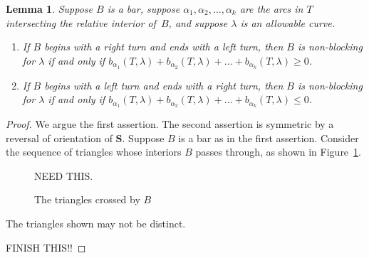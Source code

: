 \documentclass{amsart}
\newtheorem{lemma}[proposition]{Lemma}
\theoremstyle{definition}
\theoremstyle{remark}
\numberwithin{equation}{section}
\newcommand{\0}{{\mathbf{0}}}
\renewcommand{\S}{\mathbf{S}}
\begin{document}
\begin{lemma}\label{bar ineq}
Suppose $B$ is a bar, suppose $\alpha_1, \alpha_2,\ldots,\alpha_k$ are the arcs in $T$ intersecting the relative interior of~$B$, and suppose $\lambda$ is an allowable curve.
\begin{enumerate}[\qquad1.]
\item If $B$ begins with a right turn and ends with a left turn, then $B$ is non-blocking for $\lambda$ if and only if $b_{\alpha_1}(T,\lambda) + b_{\alpha_2}(T,\lambda) + ... + b_{\alpha_k}(T,\lambda) \geq 0$.
\item If $B$ begins with a left turn and ends with a right turn, then $B$ is non-blocking for $\lambda$ if and only if $b_{\alpha_1}(T,\lambda) + b_{\alpha_2}(T,\lambda) + ... + b_{\alpha_k}(T,\lambda) \leq 0$.
\end{enumerate}
\end{lemma}
\begin{proof}
We argue the first assertion.  
The second assertion is symmetric by a reversal of orientation of $\S$.
Suppose $B$ is a bar as in the first assertion.
Consider the sequence of triangles whose interiors $B$ passes through, as shown in Figure~\ref{tri seq}.
\begin{figure}
NEED THIS.
\caption{The triangles crossed by $B$}
\label{tri seq}
\end{figure}
The triangles shown may not be distinct.

FINISH THIS!!
\end{proof}
\end{document}
